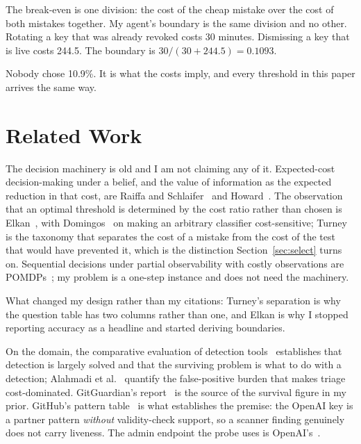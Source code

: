 \documentclass{article}
\begin{document}
The break-even is one division: the cost of the cheap mistake over the cost of
both mistakes together. My agent's boundary is the same division and no other.
Rotating a key that was already revoked costs 30 minutes. Dismissing a key that
is live costs 244.5. The boundary is $30 / (30 + 244.5) = 0.1093$.

Nobody chose 10.9\%. It is what the costs imply, and every threshold in this
paper arrives the same way.

\section{Related Work}

The decision machinery is old and I am not claiming any of it. Expected-cost
decision-making under a belief, and the value of information as the expected
reduction in that cost, are Raiffa and Schlaifer~\cite{raiffa1961applied} and
Howard~\cite{howard1966voi}. The observation that an optimal threshold is
determined by the cost ratio rather than chosen is Elkan~\cite{elkan2001foundations},
with Domingos~\cite{domingos1999metacost} on making an arbitrary classifier
cost-sensitive; Turney~\cite{turney2000types} is the taxonomy that separates the
cost of a mistake from the cost of the test that would have prevented it, which
is the distinction Section~\ref{sec:select} turns on. Sequential decisions under
partial observability with costly observations are POMDPs~\cite{smallwood1973optimal,kaelbling1998pomdp};
my problem is a one-step instance and does not need the machinery.

What changed my design rather than my citations: Turney's separation is why the
question table has two columns rather than one, and Elkan is why I stopped
reporting accuracy as a headline and started deriving boundaries.

On the domain, the comparative evaluation of detection
tools~\cite{basak2023comparative} establishes that detection is largely solved
and that the surviving problem is what to do with a detection; Alahmadi et
al.~\cite{alahmadi2022falsepositives} quantify the false-positive burden that
makes triage cost-dominated. GitGuardian's
report~\cite{gitguardian2026} is the source of the survival figure in my prior.
GitHub's pattern table~\cite{github2026patterns} is what establishes the premise:
the OpenAI key is a partner pattern \emph{without} validity-check support, so a
scanner finding genuinely does not carry liveness. The admin endpoint the probe
uses is OpenAI's~\cite{openai2026admin}.
\end{document}
